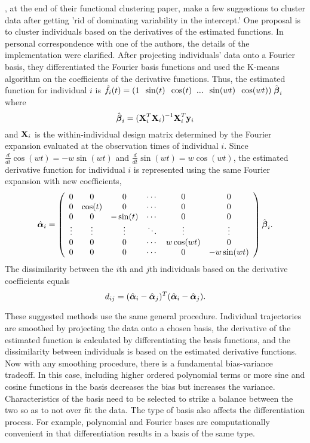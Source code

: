 \textcite{tarpey2003}, at the end of their functional clustering paper, make a few suggestions to cluster data after getting 'rid of dominating variability in the intercept.' One proposal is to cluster individuals based on the derivatives of the estimated functions. In personal correspondence with one of the authors, the details of the implementation were clarified. After projecting individuals' data onto a Fourier basis, they differentiated the Fourier basis functions and used the K-means algorithm on the coefficients of the derivative functions. Thus, the estimated function for individual $i$ is $\hat{f}_{i}(t)= (1\;\; \sin(t)\;\;\cos(t)\;\;...\;\;\sin(wt)\;\;\cos(wt))\;\hat{\boldsymbol\beta}_{i}$ where
$$\hat{\boldsymbol\beta}_{i} = (\mathbf X^{T}_{i}\mathbf X_{i})^{-1}\mathbf X^{T}_{i}\mathbf y_{i}$$
and $\mathbf X_{i}$ is the within-individual design matrix determined by the Fourier expansion evaluated at the observation times of individual $i$. Since $\frac{d}{dt}\cos(wt) = -w\sin(wt)$ and $\frac{d}{dt}\sin(wt) = w\cos(wt)$, the estimated derivative function for individual $i$ is represented using the same Fourier expansion with new coefficients, 
$$\hat{\boldsymbol\alpha}_{i} = \left(\begin{array}{cccccc}
0 & 0&0&\cdots&0&0\\
0&\cos(t)&0&\cdots&0&0\\
0&0&-\sin(t)&\cdots&0&0\\
\vdots&\vdots&\vdots&\ddots&\vdots&\vdots\\
0&0&0&\cdots&w\cos(wt)&0\\
0&0&0&\cdots&0&-w\sin(wt)\end{array}\right)\hat{\boldsymbol\beta}_{i}.$$
The dissimilarity between the $i$th and $j$th individuals based on the derivative coefficients equals
$$d_{ij} = (\hat{\boldsymbol\alpha}_{i}-\hat{\boldsymbol\alpha}_{j})^{T}(\hat{\boldsymbol\alpha}_{i}-\hat{\boldsymbol\alpha}_{j}).$$

These suggested methods use the same general procedure. Individual trajectories are smoothed by projecting the data onto a chosen basis, the derivative of the estimated function is calculated by differentiating the basis functions, and the dissimilarity between individuals is based on the estimated derivative functions. Now with any smoothing procedure, there is a fundamental bias-variance tradeoff. In this case, including higher ordered polynomial terms or more sine and cosine functions in the basis decreases the bias but increases the variance. Characteristics of the basis need to be selected to strike a balance between the two so as to not over fit the data. The type of basis also affects the differentiation process. For example, polynomial and Fourier bases are computationally convenient in that differentiation results in a basis of the same type.

